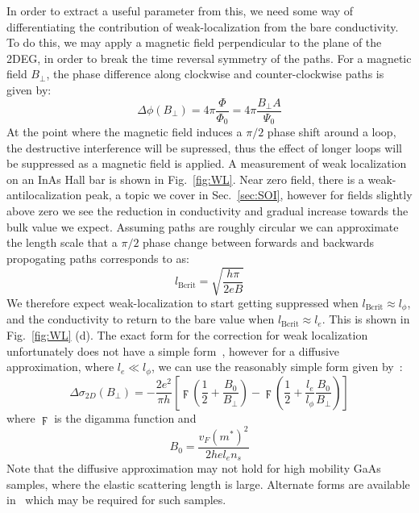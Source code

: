 In order to extract a useful parameter from this, we need some way of differentiating the contribution of weak-localization from
the bare conductivity. To do this, we may apply a magnetic field perpendicular to the plane of the 2DEG, in order to break the time
reversal symmetry of the paths. For a magnetic field $B_\perp$, the phase difference along clockwise and counter-clockwise paths
is given by:
\begin{equation}
  \Delta \phi(B_\perp) = 4 \pi \frac{\Phi}{\Phi_0} = 4\pi \frac{B_\perp A}{\Psi_0}
\end{equation}
At the point where the magnetic field induces a $\pi/2$ phase shift around a loop, the destructive interference will be supressed, thus the
effect of longer loops will be suppressed as a magnetic field is applied. A measurement of weak localization on an InAs Hall bar is shown in
Fig.~\ref{fig:WL}. Near zero field, there is a weak-antilocalization peak, a topic we cover in Sec.~\ref{sec:SOI}, however for fields
slightly above zero we see the reduction in conductivity and gradual increase towards the bulk value we expect.
Assuming paths are roughly circular we can approximate the length scale that a $\pi/2$ phase change between forwards and backwards
propogating paths corresponds to as:
\begin{equation}
  l_\textrm{Bcrit} = \sqrt{\frac{h \pi}{2 e B}}
\end{equation}
We therefore expect weak-localization to start getting suppressed when $l_\textrm{Bcrit} \approx l_\phi$, and the conductivity to return to the bare
value when $l_\textrm{Bcrit} \approx l_e$. This is shown in Fig.~\ref{fig:WL} (d). The exact form for the correction for weak localization unfortunately does not have
a simple form~\cite{PhysRevB.70.245311}, however for a diffusive approximation, where $l_e \ll l_\phi$, we can use the reasonably simple form
given by~\cite{10.1143/PTP.63.707}:
\begin{equation}
  \Delta \sigma_{2D}(B_\perp) = -\frac{2 e^2}{\pi h}\left[\digamma\left(\frac{1}{2} + \frac{B_0}{B_\perp}\right) - \digamma\left(\frac{1}{2} + \frac{l_e}{l_\phi}\frac{B_0}{B_\perp}\right)\right]
\end{equation}
where $\digamma$ is the digamma function and
\begin{equation}
  B_0 = \frac{v_F (m^*)^2}{2 h e l_e n_s}
\end{equation}
Note that the diffusive approximation may not hold for high mobility GaAs samples, where the elastic scattering length is large.
Alternate forms are available in~\cite{PhysRevB.70.245311} which may be required for such samples.

